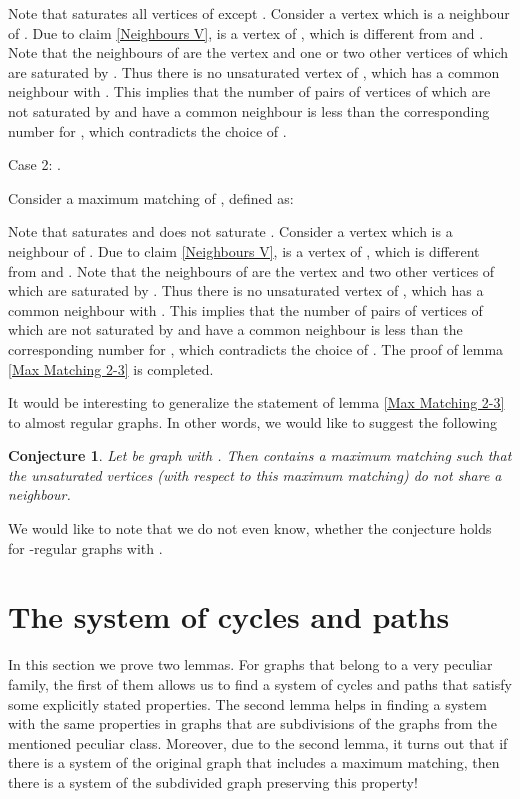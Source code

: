 \documentclass[fleqn,12pt,twoside]{article}
\newtheorem{conjecture}{Conjecture}
\newenvironment{proof}[1][Proof.]{\begin{trivlist}
\item[\hskip \labelsep {\bfseries #1}]}{\end{trivlist}}
\begin{document}
\begin{proof}
Note that  saturates all vertices of  except .
Consider a vertex  which is a neighbour of . Due to claim
\ref{Neighbours V},  is a vertex of , which is
different from  and . Note that the neighbours of  are
the vertex  and one or two other vertices of  which are
saturated by . Thus there is no unsaturated vertex of ,
which has a common neighbour with . This implies that the number
of pairs of vertices of  which are not saturated by  and
have a common neighbour is less than the corresponding number for
, which contradicts the choice of .

Case 2: .

Consider a maximum matching  of , defined as:

Note that  saturates  and does not saturate . Consider
a vertex  which is a neighbour of . Due to claim
\ref{Neighbours V},  is a vertex of , which is
different from  and . Note that the neighbours of  are
the vertex  and two other vertices of 
which are saturated by . Thus there is no unsaturated vertex of , which has a common neighbour with . This implies that the
number of pairs of vertices of  which are not saturated by
 and have a common neighbour is less than the corresponding
number for , which contradicts the choice of . The proof of
lemma \ref{Max Matching 2-3} is completed.
\end{proof}

It would be interesting to generalize the statement of lemma
\ref{Max Matching 2-3} to almost regular graphs. In other words, we
would like to suggest the following

\begin{conjecture}
Let  be graph with . Then  contains a
maximum matching such that the unsaturated vertices (with respect to
this maximum matching) do not share a neighbour.
\end{conjecture}

We would like to note that we do not even know, whether the
conjecture holds for -regular graphs with .

\section{The system of cycles and paths}

In this section we prove two lemmas. For graphs that belong to a
very peculiar family, the first of them allows us to find a system
of cycles and paths that satisfy some explicitly stated properties.
The second lemma helps in finding a system with the same properties
in graphs that are subdivisions of the graphs from the mentioned
peculiar class. Moreover, due to the second lemma, it turns out that
if there is a system of the original graph that includes a maximum
matching, then there is a system of the subdivided graph preserving
this property!
\end{document}

